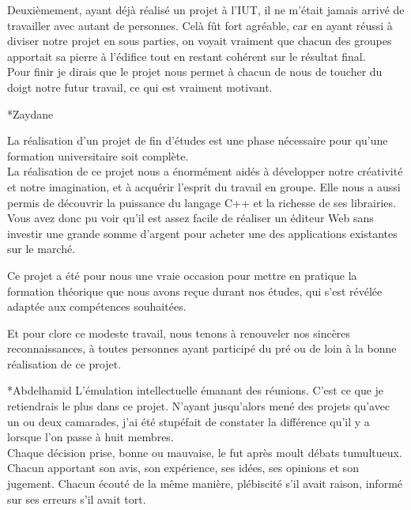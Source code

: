 \documentclass[a4paper, 12pt]{report}
\begin{document}
\begin{chapter}
\begin{section}
		Deuxièmement, ayant déjà réalisé un projet à l'IUT, il ne m'était jamais arrivé de travailler avec autant de personnes. Celà fût fort
		agréable, car en ayant réussi à diviser notre projet en sous parties, on voyait vraiment que chacun des groupes apportait sa pierre à
		l'édifice tout en restant cohérent sur le résultat final.\\

		Pour finir je dirais que le projet nous permet à chacun de nous de toucher du doigt notre futur travail, ce qui est vraiment motivant.
		\end{section}

		\begin{section}*{Zaydane}

		La réalisation d’un projet de fin d’études est une phase nécessaire pour qu’une formation universitaire soit complète.\\
		La réalisation de ce projet nous a énormément aidés à développer notre créativité et notre imagination, et à acquérir l’esprit du travail en
		groupe. Elle nous a aussi permis de découvrir la puissance du langage C++ et la richesse de ses librairies.
		Vous avez donc pu voir qu’il est assez facile de réaliser un éditeur Web sans investir une grande somme d’argent pour acheter une des
		applications existantes sur le marché.

		Ce projet a été pour nous une vraie occasion pour mettre en pratique la formation théorique que nous avons reçue durant nos études, qui s’est
		révélée adaptée aux compétences souhaitées.

		Et pour clore ce modeste travail, nous tenons à renouveler nos sincères reconnaissances, à toutes personnes ayant participé du pré ou de
		loin à la bonne réalisation de ce projet. 
		\end{section}

		\begin{section}*{Abdelhamid}
		L'émulation intellectuelle émanant des réunions. C'est ce que je retiendrais le plus dans ce projet. N'ayant jusqu'alors mené des projets
		qu'avec un ou deux camarades, j'ai été stupéfait de constater la différence qu'il y a lorsque l'on passe à huit membres.\\

		Chaque décision prise, bonne ou mauvaise, le fut après moult débats tumultueux. Chacun apportant son avis, son expérience, ses idées,
		ses opinions et son jugement. Chacun écouté de la même manière, plébiscité s'il avait raison, informé sur ses erreurs s'il avait tort.\\


\end{section}
\end{chapter}
\end{document}
